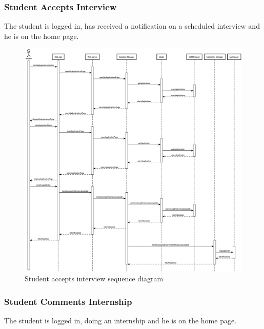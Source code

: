 \clearpage
\subsubsection{Student Accepts Interview}
The student is logged in, has received a notification on a scheduled interview and he is on the home page.

\begin{figure}[h]
    \centering
    \includegraphics[width=16cm]{images/sequence-diagrams/student-accepts-interview.png}
    \caption{Student accepts interview sequence diagram}
\end{figure}

\clearpage
\subsubsection{Student Comments Internship}
The student is logged in, doing an internship and he is on the home page.

